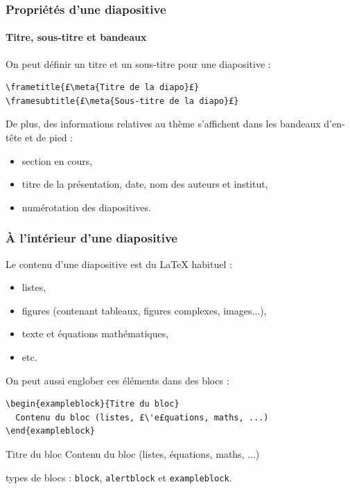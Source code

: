 \begin{frame}[fragile]
  \frametitle{Propriétés d'une diapositive}
  \framesubtitle{Titre, sous-titre et bandeaux}

On peut définir un titre et un sous-titre pour une diapositive :

\begin{lstlisting}
\frametitle{£\meta{Titre de la diapo}£}
\framesubtitle{£\meta{Sous-titre de la diapo}£}
\end{lstlisting}

\bigskip
De plus, des informations relatives au thème s'affichent dans les bandeaux d'en-tête et de pied :
\begin{itemize}
  \item section en cours,
  \item titre de la présentation, date, nom des auteurs et institut,
  \item numérotation des diapositives.
\end{itemize}
\end{frame}



\begin{frame}[fragile]
  \frametitle{À l'intérieur d'une diapositive}

Le contenu d'une diapositive est du \LaTeX{} habituel :
\begin{itemize}
  \item listes,
  \item figures (contenant tableaux, figures complexes, images...),
  \item texte et équations mathématiques,
  \item etc.
\end{itemize}

\medskip
On peut aussi englober ces éléments dans des blocs :
\begin{lstlisting}
\begin{exampleblock}{Titre du bloc}
  Contenu du bloc (listes, £\'e£quations, maths, ...)
\end{exampleblock}
\end{lstlisting}

\begin{exampleblock}{Titre du bloc}
  Contenu du bloc (listes, équations, maths, ...)
\end{exampleblock}

 types de blocs : \lstinline?block?, \lstinline?alertblock? et \lstinline?exampleblock?.
\end{frame}



